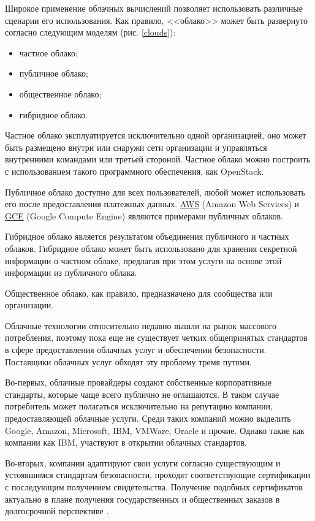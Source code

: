 Широкое применение облачных вычислений позволяет использовать различные сценарии его использования.
Как правило, <<облако>> может быть развернуто согласно следующим моделям (рис. \ref{clouds}):
\begin{itemize}
  \item частное облако;
  \item публичное облако;
  \item общественное облако;
  \item гибридное облако.
\end{itemize}


Частное облако эксплуатируется исключительно одной организацией, оно может быть размещено внутри или снаружи сети организации и управляться внутренними командами или третьей стороной.
Частное облако можно построить с использованием такого программного обеспечения, как OpenStack.

Публичное облако доступно для всех пользователей, любой может использовать его после предоставления платежных данных.
\hyperlink{aws}{AWS} (Amazon Web Services) и \hyperlink{gce}{GCE} (Google Compute Engine) являются примерами публичных облаков.

Гибридное облако является результатом объединения публичного и частных облаков.
Гибридное облако может быть использовано для хранения секретной информации о частном облаке, предлагая при этом услуги на основе этой информации из публичного облака.

Общественное облако, как правило, предназначено для сообщества или организации.

Облачные технологии относительно недавно вышли на рынок массового потребления, поэтому пока еще не существует четких общепринятых стандартов в сфере предоставления облачных услуг и обеспечении безопасности.
Поставщики облачных услуг обходят эту проблему тремя путями.

Во-первых, облачные провайдеры создают собственные корпоративные стандарты, которые чаще всего публично не оглашаются.
В таком случае потребитель может полагаться исключительно на репутацию компании, предоставляющей облачные услуги.
Среди таких компаний можно выделить Google, Amazon, Microsoft, IBM, VMWare, Oracle и прочие.
Однако такие как компании как IBM, участвуют в открытии облачных стандартов.

Во-вторых, компании адаптируют свои услуги согласно существующим и устоявшимся стандартам безопасности, проходят соответствующие сертификации с последующим получением свидетельства.
Получение подобных сертификатов актуально в плане получения государственных и общественных заказов в долгосрочной перспективе \cite{itmo}.

